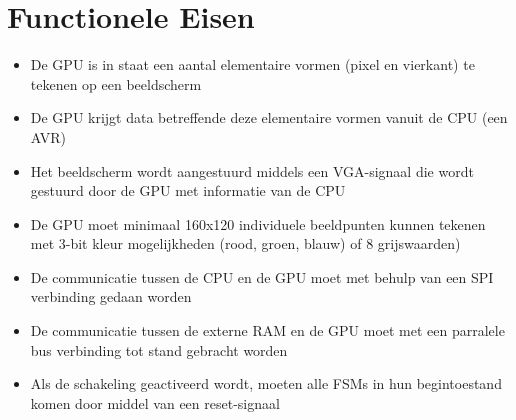 \documentclass{scrreprt} %
\begin{document}
\section {Functionele Eisen}
\begin {itemize}
\item De GPU is in staat een aantal elementaire vormen (pixel en vierkant) te tekenen op een beeldscherm
\item De GPU krijgt data betreffende deze elementaire vormen vanuit de CPU (een AVR)
\item Het beeldscherm wordt aangestuurd middels een VGA-signaal die wordt gestuurd door de GPU met informatie van de CPU
\item De GPU moet minimaal 160x120 individuele beeldpunten kunnen tekenen met 3-bit kleur mogelijkheden (rood, groen, blauw) of 8 grijswaarden)
\item De communicatie tussen de CPU en de GPU moet met behulp van een SPI verbinding gedaan worden
\item De communicatie tussen de externe RAM en de GPU moet met een parralele bus verbinding tot stand gebracht worden
\item Als de schakeling geactiveerd wordt, moeten alle FSMs in hun begintoestand komen door middel van een reset-signaal
\end{itemize}
\end{document}
